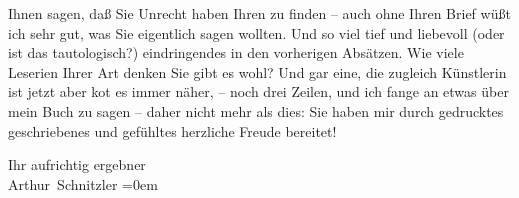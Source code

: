                Ihnen sagen, daß Sie Unrecht haben Ihren \label{K_L02583-2v}\label{K_L02583-2} zu finden – auch ohne Ihren Brief {\pb}wüßt ich sehr gut, was Sie eigentlich
               sagen wollten. Und so viel tief und liebevoll (oder ist das tautologisch?)
               eindringendes in den vorherigen Absätzen. Wie
               viele Leseri{\geminationn}en Ihrer Art denken Sie gibt es wohl? Und
               gar eine, die zugleich Künstlerin ist { }{\dotsfive} jetzt aber ko{\geminationm}t es immer
               näher, – noch drei Zeilen, und ich fange an etwas über mein {\pb}Buch zu sagen – daher nicht
               mehr als dies: Sie haben mir durch gedrucktes geschriebenes und
               gefühltes herzliche Freude bereitet!\pend
           
\pstart
           Ihr aufrichtig ergebner{\\[\baselineskip]}\spacefill\mbox{Arthur Schnitzler}\pend
           \leftskip=0em{}\endnumbering{}  \newcommand{\dateiname}{L02583}\newcommand{\titel}{Arthur Schnitzler an Auguste Hauschner, 23. 1. 1909}\newcommand{\editorInnen}{Martin Anton Müller und Laura Untner}
